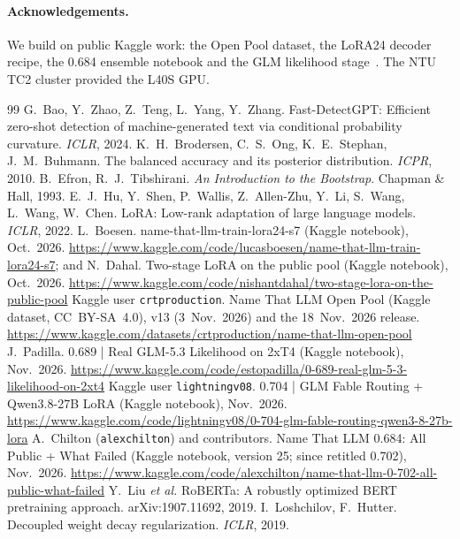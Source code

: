 \documentclass[10pt,twocolumn,letterpaper]{article}
\begin{document}
\paragraph{Acknowledgements.} We build on public Kaggle work: the Open Pool dataset, the LoRA24 decoder recipe, the 0.684 ensemble notebook and the GLM likelihood stage~\cite{kaggle_pool,kaggle_lora24,kaggle_public684,kaggle_glm}. The NTU TC2 cluster provided the L40S GPU.

\small
\begin{thebibliography}{99}\setlength{\itemsep}{0pt}
 G.~Bao, Y.~Zhao, Z.~Teng, L.~Yang, Y.~Zhang. Fast-DetectGPT: Efficient zero-shot detection of machine-generated text via conditional probability curvature. \emph{ICLR}, 2024.
 K.~H.~Brodersen, C.~S.~Ong, K.~E.~Stephan, J.~M.~Buhmann. The balanced accuracy and its posterior distribution. \emph{ICPR}, 2010.
 B.~Efron, R.~J.~Tibshirani. \emph{An Introduction to the Bootstrap}. Chapman \& Hall, 1993.
 E.~J.~Hu, Y.~Shen, P.~Wallis, Z.~Allen-Zhu, Y.~Li, S.~Wang, L.~Wang, W.~Chen. LoRA: Low-rank adaptation of large language models. \emph{ICLR}, 2022.
 L.~Boesen. name-that-llm-train-lora24-s7 (Kaggle notebook), Oct.~2026. \url{https://www.kaggle.com/code/lucasboesen/name-that-llm-train-lora24-s7}; and N.~Dahal. Two-stage LoRA on the public pool (Kaggle notebook), Oct.~2026. \url{https://www.kaggle.com/code/nishantdahal/two-stage-lora-on-the-public-pool}
 Kaggle user \texttt{crtproduction}. Name That LLM Open Pool (Kaggle dataset, CC~BY-SA~4.0), v13 (3~Nov.~2026) and the 18~Nov.~2026 release. \url{https://www.kaggle.com/datasets/crtproduction/name-that-llm-open-pool}
 J.~Padilla. 0.689 | Real GLM-5.3 Likelihood on 2xT4 (Kaggle notebook), Nov.~2026. \url{https://www.kaggle.com/code/estopadilla/0-689-real-glm-5-3-likelihood-on-2xt4}
 Kaggle user \texttt{lightningv08}. 0.704 | GLM Fable Routing + Qwen3.8-27B LoRA (Kaggle notebook), Nov.~2026. \url{https://www.kaggle.com/code/lightningv08/0-704-glm-fable-routing-qwen3-8-27b-lora}
 A.~Chilton (\texttt{alexchilton}) and contributors. Name That LLM 0.684: All Public + What Failed (Kaggle notebook, version 25; since retitled 0.702), Nov.~2026. \url{https://www.kaggle.com/code/alexchilton/name-that-llm-0-702-all-public-what-failed}
 Y.~Liu \emph{et al.} RoBERTa: A robustly optimized BERT pretraining approach. arXiv:1907.11692, 2019.
 I.~Loshchilov, F.~Hutter. Decoupled weight decay regularization. \emph{ICLR}, 2019.

\end{thebibliography}
\end{document}
